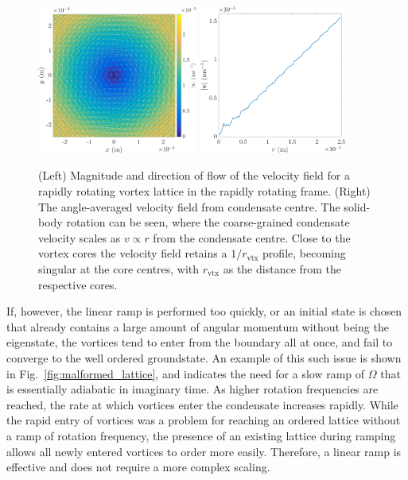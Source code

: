 \begin{figure}\centering
    \includegraphics[width=0.47\textwidth,clip,trim={0cm 0cm 0 0cm}]{Images/ch4_vtx/solidbody_v}
    \includegraphics[width=0.43\textwidth,clip,trim={0cm 0cm 0 0cm}]{Images/ch4_vtx/solidbody_vel_r}
    \caption{(Left) Magnitude and direction of flow of the velocity field for a rapidly rotating vortex lattice in the rapidly rotating frame. (Right) The angle-averaged velocity field from condensate centre. The solid-body rotation can be seen, where the coarse-grained condensate velocity scales as $v \propto r$ from the condensate centre. Close to the vortex cores the velocity field retains a $1/r_{\textrm{vtx}}$ profile, becoming singular at the core centres, with $r_{\textrm{vtx}}$ as the distance from the respective cores.}
    \label{fig:solidbody}
\end{figure}

If, however, the linear ramp is performed too quickly, or an initial state is chosen that already contains a large amount of angular momentum without being the eigenstate, the vortices tend to enter from the boundary all at once, and fail to converge to the well ordered groundstate. An example of this such issue is shown in Fig.~\ref{fig:malformed_lattice}, and indicates the need for a slow ramp of $\Omega$ that is essentially adiabatic in imaginary time. As higher rotation frequencies are reached, the rate at which vortices enter the condensate increases rapidly. While the rapid entry of vortices was a problem for reaching an ordered lattice without a ramp of rotation frequency, the presence of an existing lattice during ramping allows all newly entered vortices to order more easily. Therefore, a linear ramp is effective and does not require a more complex scaling.

